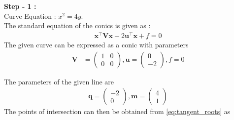 \documentclass[10pt,a4paper]{report}
\newcommand{\myvec}[1]{\ensuremath{\begin{pmatrix}#1\end{pmatrix}}}
\let\vec\mathbf
\providecommand{\brak}[1]{\ensuremath{\left(#1\right)}}
\providecommand{\lbrak}[1]{\ensuremath{\left(#1\right.}}
\providecommand{\rbrak}[1]{\ensuremath{\left.#1\right)}}
\providecommand{\sbrak}[1]{\ensuremath{{}\left[#1\right]}}
\begin{document}
\begin{multicols}{2}
\raggedright \textbf{Step - 1 :}\\ \vspace{2mm}
Curve Equation : $x^2=4y$. \\ \vspace{1mm}
The standard equation of the conics is given as :
\begin{align}
\vec{x}^{\top}\vec{V}\vec{x}+2\vec{u}^{\top}\vec{x}+f=0
\end{align}
\fi
The given curve  can be expressed as a conic with parameters
\begin{align}
	\vec{V} &= \myvec{1 & 0\\0 & 0}, \vec{u} = \myvec{0 \\-2}, f = 0
	\end{align}

The parameters of the given line are
\begin{align}
\vec{q} = \myvec{-2 \\0} , \vec{m}=\myvec{4\\1}
\end{align}
The points of intersection can then be obtained from \eqref{eq:tangent_roots} as

\end{multicols}
\end{document}
